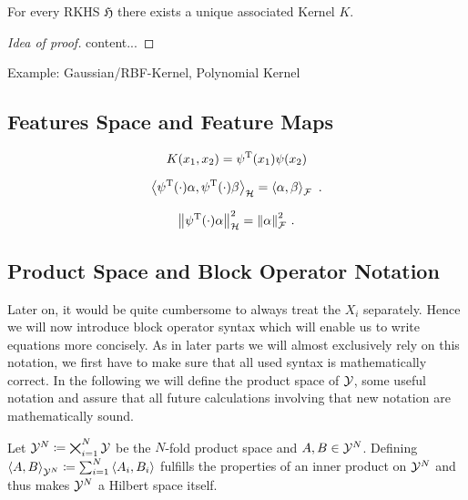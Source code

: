 \begin{theorem}
	\label{theo:kernel-for-rkhs}
	For every RKHS $\mathfrak{H}$ there exists a unique associated Kernel $K$.
\end{theorem}
\begin{proof}[Idea of proof]
	content...
\end{proof}

Example: Gaussian/RBF-Kernel, Polynomial Kernel

\subsection{Features Space and Feature Maps}


\begin{equation}
	\label{eq:kernel-feature-map}
	K(x_1, x_2) = \psi^{\mathrm{T}}(x_1)\psi(x_2)
\end{equation}

\begin{theorem}
	\begin{equation}
		\left< \psi^{\mathrm{T}}(\cdot) \alpha, \psi^{\mathrm{T}}(\cdot) \beta\right>_\mathcal{H} = \left< \alpha, \beta\right>_\mathcal{F} \ .
	\end{equation}
\end{theorem}
\begin{corollary}
	\label{cor:feature-space-norm}
	\begin{equation}
		\norm{\psi^{\mathrm{T}}(\cdot)\alpha}_\mathcal{H}^2 = \norm{\alpha}_\mathcal{F}^2 \ .
	\end{equation}
\end{corollary}

\subsection{Product Space and Block Operator Notation}
Later on, it would be quite cumbersome to always treat the $X_i$ separately.
Hence we will now introduce block operator syntax which will enable us to write equations more concisely.
As in later parts we will almost exclusively rely on this notation, we first have to make sure that all used syntax is mathematically correct.
In the following we will define the product space of $\mathcal{Y}$, some useful notation and assure that all future calculations involving that new notation are mathematically sound.

Let $\mathcal{Y}^N \coloneqq \bigtimes_{i=1}^N \mathcal{Y}$ be the $N$-fold product space and $A, B \in \mathcal{Y}^N$.
Defining $\left < A, B \right >_{\mathcal{Y}^N} \coloneqq \sum_{i=1}^{N} \left <A_i, B_i \right >$ fulfills the properties of an inner product on $\mathcal{Y}^N$ and thus makes $\mathcal{Y}^N$ a Hilbert space itself.


